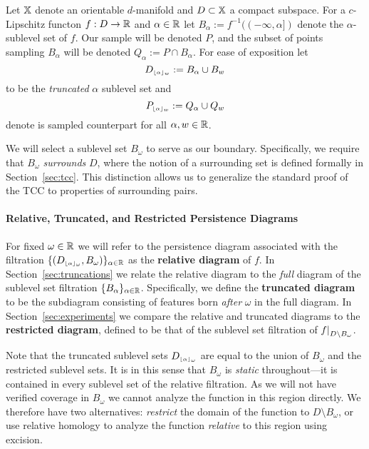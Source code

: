 
Let $\mathbb{X}$ denote an orientable $d$-manifold and $D\subset\mathbb{X}$ a compact subspace.
For a $c$-Lipschitz functon $f : D\to \mathbb{R}$ and $\alpha\in\mathbb{R}$ let $B_\alpha := f^{-1}((-\infty,\alpha])$ denote the $\alpha$-sublevel set of $f$.
Our sample will be denoted $P$, and the subset of points sampling $B_\alpha$ will be denoted $Q_\alpha := P\cap B_\alpha$.
For ease of exposition let
\[ D_{\scriptscriptstyle \lfloor\alpha\rfloor_{w}} := B_\alpha\cup B_w \]
to be the \emph{truncated} $\alpha$ sublevel set and  %
\[ P_{\scriptscriptstyle \lfloor\alpha\rfloor_{w}} := Q_\alpha\cup Q_w\]
denote is sampled counterpart for all $\alpha,w\in\mathbb{R}$.

We will select a sublevel set $B_\omega$ to serve as our boundary.
Specifically, we require that $B_\omega$ \emph{surrounds} $D$, where the notion of a surrounding set is defined formally in Section~\ref{sec:tcc}.
This distinction allows us to generalize the standard proof of the TCC to properties of surrounding pairs.

\paragraph{Relative, Truncated, and Restricted Persistence Diagrams}

For fixed $\omega\in\mathbb{R}$ we will refer to the persistence diagram associated with the filtration $\{(D_{\scriptscriptstyle \lfloor\alpha\rfloor_{\omega}}, B_\omega)\}_{\alpha\in\mathbb{R}}$  as the \textbf{relative diagram} of $f$.
In Section~\ref{sec:truncations} we relate the relative diagram to the \emph{full} diagram of the sublevel set filtration $\{B_\alpha\}_{\alpha\in\mathbb{R}}$.
Specifically, we define the \textbf{truncated diagram} to be the subdiagram consisting of features born \emph{after} $\omega$ in the full diagram.
In Section~\ref{sec:experiments} we compare the relative and truncated diagrams to the \textbf{restricted diagram}, defined to be that of the sublevel set filtration of $f\mathord{\mid}_{D\setminus B_\omega}$.%

Note that the truncated sublevel sets $D_{\scriptscriptstyle \lfloor\alpha\rfloor_{\omega}}$ are equal to the union of $B_\omega$ and the restricted sublevel sets.
It is in this sense that $B_\omega$ is \emph{static} throughout---it is contained in every sublevel set of the relative filtration.
As we will not have verified coverage in $B_\omega$ we cannot analyze the function in this region directly.
We therefore have two alternatives: \emph{restrict} the domain of the function to $D\setminus B_\omega$, or use relative homology to analyze the function \emph{relative} to this region using excision.

